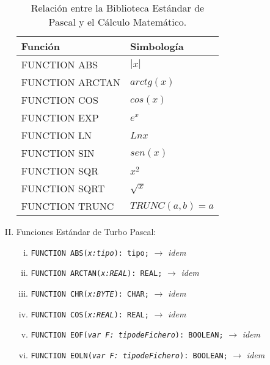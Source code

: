 \begin{enumerate}[I.]
\begin{table}[h]
\begin{center}

\begin{tabular}{|l|l|}\hline
\textbf{Función} & \textbf{Simbología} \\
\hline
\hline
FUNCTION ABS & $|x|$ \\ \hline
FUNCTION ARCTAN & $arctg(x)$ \\ \hline
FUNCTION COS & $cos(x)$ \\ \hline
FUNCTION EXP & $e^x$ \\ \hline
FUNCTION LN & $Ln x$ \\ \hline
FUNCTION SIN & $sen(x)$ \\ \hline
FUNCTION SQR & $x^2$ \\ \hline
FUNCTION SQRT & $\sqrt{x}$ \\ \hline
FUNCTION TRUNC & $TRUNC(a,b) = a$ \\ \hline

\end{tabular}

\caption{Relación entre la Biblioteca Estándar de Pascal y el Cálculo 
Matemático.}

\end{center}

\end{table}


\item {}Funciones Estándar de Turbo Pascal:

\begin{enumerate}[i.]
\item \texttt{FUNCTION ABS(\textit{x:tipo}): tipo;} $\rightarrow$ \textit{idem}

\item \texttt{FUNCTION ARCTAN(\textit{x:REAL}): REAL;} $\rightarrow$ 
\textit{idem}

\item \texttt{FUNCTION CHR(\textit{x:BYTE}): CHAR;} $\rightarrow$ \textit{idem}

\item \texttt{FUNCTION COS(\textit{x:REAL}): REAL;} $\rightarrow$ \textit{idem}

\item \texttt{FUNCTION EOF(\textit{var F: tipodeFichero}): BOOLEAN;} 
$\rightarrow$ \textit{idem}

\item \texttt{FUNCTION EOLN(\textit{var F: tipodeFichero}): BOOLEAN;} 
$\rightarrow$ \textit{idem}


\end{enumerate}
\end{enumerate}
